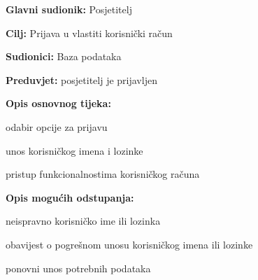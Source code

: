					\noindent {}
					\begin{packed_item}
	
						\item \textbf{Glavni sudionik: }Posjetitelj
						\item  \textbf{Cilj:} Prijava u vlastiti korisnički račun
						\item  \textbf{Sudionici:} Baza podataka
						\item  \textbf{Preduvjet:} posjetitelj je prijavljen
						\item  \textbf{Opis osnovnog tijeka:}
						
						\item[] \begin{packed_enum}
	
							\item odabir opcije za prijavu 
							\item unos korisničkog imena i lozinke
							\item pristup funkcionalnostima korisničkog računa
							
						\end{packed_enum}
						
						\item  \textbf{Opis mogućih odstupanja:}
						
						\item[] \begin{packed_item}
	
							\item[2.a] neispravno korisničko ime ili lozinka
							\item[] \begin{packed_enum}
								
								\item obavijest o pogrešnom unosu korisničkog imena ili lozinke
								\item ponovni unos potrebnih podataka
								
							\end{packed_enum}
							
						\end{packed_item}
					\end{packed_item}
					
